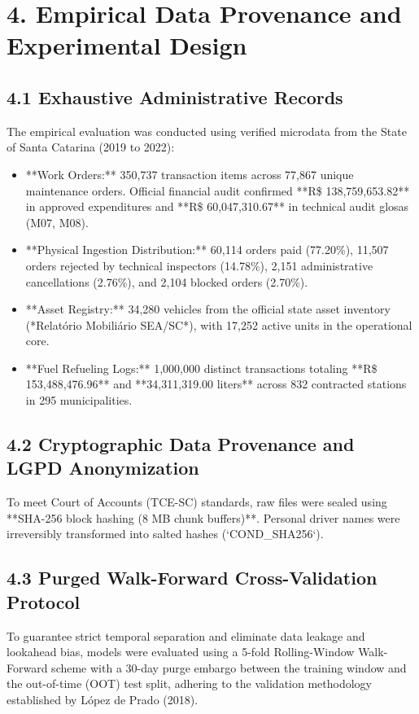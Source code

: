 \documentclass[10pt,a4paper,journal]{article}
\begin{document}
\section{4. Empirical Data Provenance and Experimental Design}
\subsection{4.1 Exhaustive Administrative Records}
The empirical evaluation was conducted using verified microdata from the State of Santa Catarina (2019 to 2022):

\begin{itemize}
\item **Work Orders:** 350,737 transaction items across 77,867 unique maintenance orders. Official financial audit confirmed **R\$ 138,759,653.82** in approved expenditures and **R\$ 60,047,310.67** in technical audit glosas (M07, M08).
\end{itemize}
\begin{itemize}
\item **Physical Ingestion Distribution:** 60,114 orders paid (77.20\%), 11,507 orders rejected by technical inspectors (14.78\%), 2,151 administrative cancellations (2.76\%), and 2,104 blocked orders (2.70\%).
\end{itemize}
\begin{itemize}
\item **Asset Registry:** 34,280 vehicles from the official state asset inventory (*Relatório Mobiliário SEA/SC*), with 17,252 active units in the operational core.
\end{itemize}
\begin{itemize}
\item **Fuel Refueling Logs:** 1,000,000 distinct transactions totaling **R\$ 153,488,476.96** and **34,311,319.00 liters** across 832 contracted stations in 295 municipalities.
\end{itemize}
\subsection{4.2 Cryptographic Data Provenance and LGPD Anonymization}
To meet Court of Accounts (TCE-SC) standards, raw files were sealed using **SHA-256 block hashing (8 MB chunk buffers)**. Personal driver names were irreversibly transformed into salted hashes (`COND\_SHA256`).

\subsection{4.3 Purged Walk-Forward Cross-Validation Protocol}
To guarantee strict temporal separation and eliminate data leakage and lookahead bias, models were evaluated using a 5-fold Rolling-Window Walk-Forward scheme with a 30-day purge embargo between the training window and the out-of-time (OOT) test split, adhering to the validation methodology established by López de Prado (2018).
\end{document}

